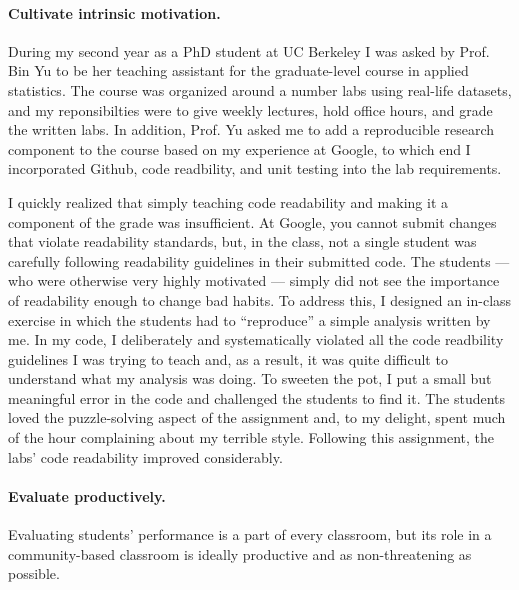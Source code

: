 \paragraph{Cultivate intrinsic motivation.}
%
During my second year as a PhD student at UC Berkeley I was asked by Prof. Bin
Yu to be her teaching assistant for the graduate-level course in applied
statistics.  The course was organized around a number labs using real-life
datasets, and my reponsibilties were to give weekly lectures, hold office hours,
and grade the written labs.  In addition, Prof. Yu asked me to add a
reproducible research component to the course based on my experience at Google,
to which end I incorporated Github, code readbility, and unit testing into
the lab requirements.

I quickly realized that simply teaching code readability and making it a
component of the grade was insufficient.  At Google, you cannot submit changes
that violate readability standards, but, in the class, not a single student was
carefully following readability guidelines in their submitted code.  The
students --- who were otherwise very highly motivated --- simply did not see the
importance of readability enough to change bad habits.  To address this, I
designed an in-class exercise in which the students had to ``reproduce'' a
simple analysis written by me.  In my code, I deliberately and systematically
violated all the code readbility guidelines I was trying to teach and, as a
result, it was quite difficult to understand what my analysis was doing.  To
sweeten the pot, I put a small but meaningful error in the code and challenged
the students to find it.  The students loved the puzzle-solving aspect of the
assignment and, to my delight, spent much of the hour complaining about my
terrible style.  Following this assignment, the labs' code readability improved
considerably.


\paragraph{Evaluate productively.}

Evaluating students' performance is a part of every classroom, but its role in a
community-based classroom is ideally productive and as non-threatening as
possible.

